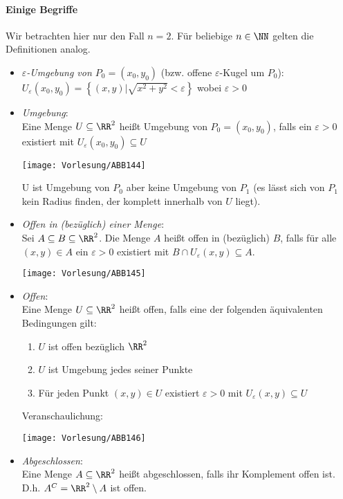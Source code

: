 \paragraph{Einige Begriffe}\parskp
Wir betrachten hier nur den Fall $n=2$. Für beliebige $n\in \NN$ gelten die Definitionen analog.
\begin{itemize}
\item \emph{$\varepsilon$-Umgebung von $P_0=(x_0, y_0)$} (bzw. offene $\varepsilon$-Kugel um $P_0$):\\
$U_\varepsilon (x_0, y_0) =\left\lbrace (x,y)| \sqrt{x^2+y^2}<\varepsilon\right\rbrace$ wobei $\varepsilon>0$
\item \emph{Umgebung}: \\
Eine Menge $U \subseteq \RR^2$ heißt Umgebung von $P_0=(x_0,y_0)$, falls ein $\varepsilon>0$ existiert mit $U_\varepsilon(x_0,y_0) \subseteq U$
\begin{center}
\texttt{[image: Vorlesung/ABB144]}
\end{center}
U ist Umgebung von $P_0$ aber keine Umgebung von $P_1$ (es lässt sich von $P_1$ kein Radius finden, der komplett innerhalb von $U$ liegt).
\item \emph{Offen in (bezüglich) einer Menge}:\\
Sei $A\subseteq B \subseteq \RR^2$. Die Menge $A$ heißt offen in (bezüglich) $B$, falls für alle $(x,y) \in A$ ein $\varepsilon>0$ existiert mit $B \cap U_\varepsilon (x,y) \subseteq A$.
\begin{center}
\texttt{[image: Vorlesung/ABB145]}
\end{center}
\item \emph{Offen}:\\
Eine Menge $U \subseteq \RR^2$ heißt offen, falls eine der folgenden äquivalenten Bedingungen gilt:
\begin{enumerate}
\item $U$ ist offen bezüglich $\RR^2$
\item $U$ ist Umgebung jedes seiner Punkte
\item Für jeden Punkt $(x,y) \in U$ existiert $\varepsilon > 0$ mit $U_\varepsilon (x,y) \subseteq U$
\end{enumerate}
Veranschaulichung:
\begin{center}
\texttt{[image: Vorlesung/ABB146]}
\end{center}
\item \emph{Abgeschlossen}:\\
Eine Menge $A \subseteq \RR^2$ heißt abgeschlossen, falls ihr Komplement offen ist. D.h. $A^C=\RR^2\setminus A$ ist offen.

\end{itemize}
